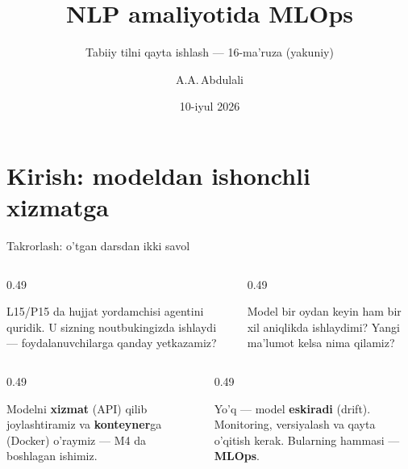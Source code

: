 \documentclass[aspectratio=169,11pt]{beamer}
\title[MLOps]{NLP amaliyotida MLOps}
\subtitle{Tabiiy tilni qayta ishlash --- 16-ma'ruza (yakuniy)}
\author[A.A.\,Abdulali]{A.A.\,Abdulali}
\date{10-iyul 2026}
\institute{11:00--12:20 \quad$\cdot$\quad mavzu \textnumero{}16}
\begin{document}

\maketitle

\section[Kirish]{Kirish: modeldan ishonchli xizmatga}

\begin{frame}{Takrorlash: o'tgan darsdan ikki savol}
  \begin{columns}[T]
    \begin{column}{0.49\textwidth}
      \begin{tcolorbox}[warnbox,title=1-savol]
        \small
        L15/P15 da hujjat yordamchisi agentini quridik. U sizning
        noutbukingizda ishlaydi --- foydalanuvchilarga qanday yetkazamiz?
      \end{tcolorbox}
    \end{column}
    \begin{column}{0.49\textwidth}
      \begin{tcolorbox}[warnbox,title=2-savol]
        \small
        Model bir oydan keyin ham bir xil aniqlikda ishlaydimi? Yangi
        ma'lumot kelsa nima qilamiz?
      \end{tcolorbox}
    \end{column}
  \end{columns}
  \pause
  \vspace{4pt}
  \begin{columns}[T]
    \begin{column}{0.49\textwidth}
      \begin{tcolorbox}[okbox,title=1-javob]
        \small
        Modelni \textbf{xizmat} (API) qilib joylashtiramiz va
        \textbf{konteyner}ga (Docker) o'raymiz --- M4 da boshlagan ishimiz.
      \end{tcolorbox}
    \end{column}
    \begin{column}{0.49\textwidth}
      \begin{tcolorbox}[okbox,title=2-javob]
        \small
        Yo'q --- model \textbf{eskiradi} (drift). Monitoring, versiyalash va
        qayta o'qitish kerak. Bularning hammasi --- \textbf{MLOps}.
      \end{tcolorbox}
    \end{column}
  \end{columns}
\end{frame}
\end{document}
